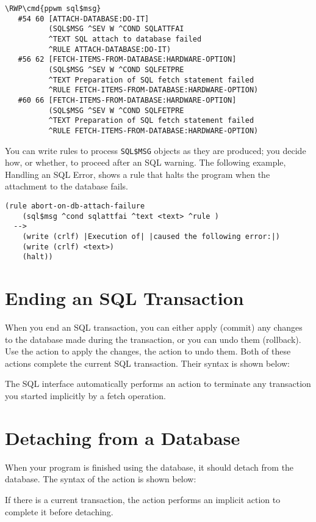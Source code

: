\begin{exampl}
\begin{Verbatim}[commandchars=\\\{\}]
\RWP\cmd{ppwm sql$msg}
   #54 60 [ATTACH-DATABASE:DO-IT]
          (SQL$MSG ^SEV W ^COND SQLATTFAI 
          ^TEXT SQL attach to database failed 
          ^RULE ATTACH-DATABASE:DO-IT)
   #56 62 [FETCH-ITEMS-FROM-DATABASE:HARDWARE-OPTION]
          (SQL$MSG ^SEV W ^COND SQLFETPRE 
          ^TEXT Preparation of SQL fetch statement failed
          ^RULE FETCH-ITEMS-FROM-DATABASE:HARDWARE-OPTION)
   #60 66 [FETCH-ITEMS-FROM-DATABASE:HARDWARE-OPTION]
          (SQL$MSG ^SEV W ^COND SQLFETPRE 
          ^TEXT Preparation of SQL fetch statement failed 
          ^RULE FETCH-ITEMS-FROM-DATABASE:HARDWARE-OPTION)
\end{Verbatim}
\end{exampl}
  
You can write rules to process
\verb|SQL$MSG| objects as they are produced; you decide how, or
whether, to proceed after an SQL warning. The following example,
Handling an SQL Error, shows a rule that halts the program when the
attachment to the database fails.

\begin{exampl}
\begin{verbatim}
(rule abort-on-db-attach-failure
    (sql$msg ^cond sqlattfai ^text <text> ^rule )
  -->
    (write (crlf) |Execution of| |caused the following error:|)
    (write (crlf) <text>)
    (halt))
\end{verbatim}
\end{exampl}

\section{Ending an SQL Transaction}

When you end an SQL transaction, you can either apply (commit) any
changes to the database made during the transaction, or you can undo
them (rollback). Use the  action to apply the changes, the
 action to undo them. Both of these actions complete the
current SQL transaction. Their syntax is shown below:



The SQL interface automatically performs an  action to
terminate any transaction you started implicitly by a fetch operation.

\section{Detaching from a Database}
 
When your program is finished using the database, it should detach
from the database. The syntax of the  action is shown below:


If there is a current transaction, the  action performs an
implicit  action to complete it before detaching.

